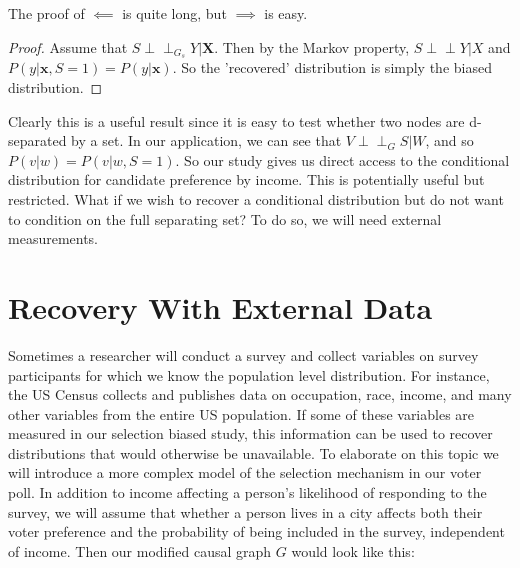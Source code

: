 \documentclass[12pt]{article}
\theoremstyle{definition}
\newcommand{\dsep}{\perp \!\!\!\perp}
\begin{document}
The proof of $\impliedby$ is quite long, but $\implies$ is easy. 

\begin{proof}
Assume that $S \dsep_{G_s} Y | \mathbf{X}$. Then by the Markov property, $S \dsep Y | X$ and $P(y | \mathbf{x}, S = 1) = P(y | \mathbf{x})$. So the 'recovered' distribution is simply the biased distribution.
\end{proof} 

Clearly this is a useful result since it is easy to test whether two nodes are d-separated by a set. In our application, we can see that $V \dsep_G S | W$, and so $P(v|w) = P(v|w, S = 1)$. So our study gives us direct access to the conditional distribution for candidate preference by income. This is potentially useful but restricted. What if we wish to recover a conditional distribution but do not want to condition on the full separating set? To do so, we will need external measurements.

\section{Recovery With External Data}

Sometimes a researcher will conduct a survey and collect variables on survey participants for which we know the population level distribution. For instance, the US Census collects and publishes data on occupation, race, income, and many other variables from the entire US population. If some of these variables are measured in our selection biased study, this information can be used to recover distributions that would otherwise be unavailable. To elaborate on this topic we will introduce a more complex model of the selection mechanism in our voter poll. In addition to income affecting a person's likelihood of responding to the survey, we will assume that whether a person lives in a city affects both their voter preference and the probability of being included in the survey, independent of income. Then our modified causal graph $G$ would look like this:

\begin{center}
\end{center}
\end{document}
